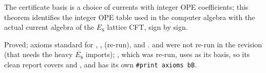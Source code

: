 \begin{physics}
The certificate basis is a choice of currents with integer OPE coefficients; this theorem identifies the integer OPE table used in the
computer algebra with the actual current algebra of the $E_8$ lattice CFT, sign by sign.
\end{physics}

\begin{status}
Proved; axioms standard for , ,  (re-run), and
.  and  were not re-run in the revision (that needs the heavy $E_8$ imports); ,
which was re-run, uses  as its basis, so its clean report covers  and , and  has
its own \texttt{\#print axioms bB}.
\end{status}


